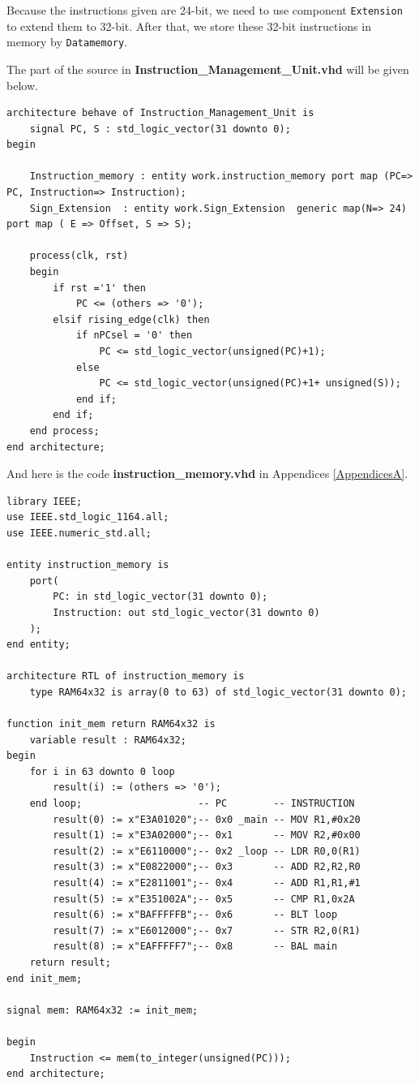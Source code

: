 Because the instructions given are 24-bit, we need to use component \texttt{Extension} to extend them to 32-bit.
After that, we store these 32-bit instructions in memory by \texttt{Datamemory}.

The part of the source in \textbf{Instruction\_Management\_Unit.vhd} will be given below.
\begin{lstlisting}[style=vhdl,breaklines]
architecture behave of Instruction_Management_Unit is
	signal PC, S : std_logic_vector(31 downto 0);  
begin

	Instruction_memory : entity work.instruction_memory port map (PC=> PC, Instruction=> Instruction); 
	Sign_Extension  : entity work.Sign_Extension  generic map(N=> 24) port map ( E => Offset, S => S); 

	process(clk, rst) 
	begin 
        if rst ='1' then 
            PC <= (others => '0'); 
        elsif rising_edge(clk) then 
            if nPCsel = '0' then 
                PC <= std_logic_vector(unsigned(PC)+1);	
            else 
                PC <= std_logic_vector(unsigned(PC)+1+ unsigned(S));	
            end if; 
        end if; 
	end process; 
end architecture;
\end{lstlisting}

And here is the code \textbf{instruction\_memory.vhd} in Appendices \ref{AppendicesA}.

\begin{lstlisting}[style=vhdl, columns=fixed,breaklines]
library IEEE;
use IEEE.std_logic_1164.all;
use IEEE.numeric_std.all;

entity instruction_memory is
    port(
        PC: in std_logic_vector(31 downto 0);
        Instruction: out std_logic_vector(31 downto 0)
    );
end entity;

architecture RTL of instruction_memory is
    type RAM64x32 is array(0 to 63) of std_logic_vector(31 downto 0);
    
function init_mem return RAM64x32 is 
    variable result : RAM64x32;
begin
    for i in 63 downto 0 loop
        result(i) := (others => '0');
    end loop;					 -- PC        -- INSTRUCTION  
        result(0) := x"E3A01020";-- 0x0 _main -- MOV R1,#0x20 
        result(1) := x"E3A02000";-- 0x1		  -- MOV R2,#0x00 
        result(2) := x"E6110000";-- 0x2 _loop -- LDR R0,0(R1)  
        result(3) := x"E0822000";-- 0x3		  -- ADD R2,R2,R0 
        result(4) := x"E2811001";-- 0x4		  -- ADD R1,R1,#1 
        result(5) := x"E351002A";-- 0x5		  -- CMP R1,0x2A  
        result(6) := x"BAFFFFFB";-- 0x6		  -- BLT loop 	 
        result(7) := x"E6012000";-- 0x7		  -- STR R2,0(R1) 
        result(8) := x"EAFFFFF7";-- 0x8		  -- BAL main	 
    return result;
end init_mem;	

signal mem: RAM64x32 := init_mem;

begin 
    Instruction <= mem(to_integer(unsigned(PC)));
end architecture;
	
\end{lstlisting}

